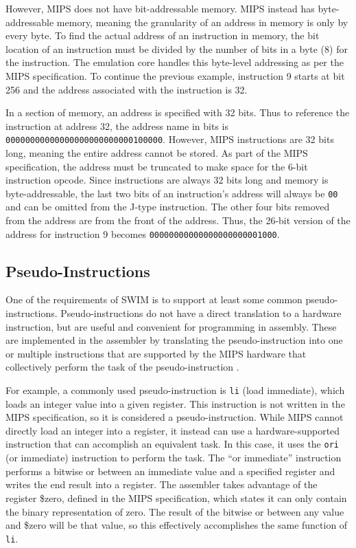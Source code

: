 \documentclass[
    paper=letter,
    parskip=half,
    fontsize=12pt,
    titlepage=firstiscover,
    toc=bibliography,
    numbers=endperiod
]{scrartcl}
\begin{document}
However, MIPS does not have bit-addressable
\cite{sciencedirect-addressable-memory} memory. MIPS instead has
byte-addressable memory, meaning the granularity of an address in memory
is only by every byte. To find the actual address of an instruction in
memory, the bit location of an instruction must be divided by the number
of bits in a byte (8) for the instruction. The emulation core handles
this byte-level addressing as per the MIPS specification. To continue
the previous example, instruction 9 starts at bit 256 and the address
associated with the instruction is 32.

In a section of memory, an address is specified with 32 bits. Thus to
reference the instruction at address 32, the address name in bits is
\texttt{00000000000000000000000000100000}. However, MIPS instructions
are 32 bits long, meaning the entire address cannot be stored. As part
of the MIPS specification, the address must be truncated to make space
for the 6-bit instruction opcode. Since instructions are always 32 bits
long and memory is byte-addressable, the last two bits of an
instruction's address will always be \texttt{00} and can be omitted from
the J-type instruction. The other four bits removed from the address are
from the front of the address. Thus, the 26-bit version of the address
for instruction 9 becomes \texttt{00000000000000000000001000}.

\subsection{Pseudo-Instructions}

One of the requirements of SWIM is to support at least some common
pseudo-instructions. Pseudo-instructions do not have a direct
translation to a hardware instruction, but are useful and convenient for
programming in assembly. These are implemented in the assembler by
translating the pseudo-instruction into one or multiple instructions
that are supported by the MIPS hardware that collectively perform the
task of the pseudo-instruction \cite{koehn-pseudoinstructions}.

For example, a commonly used pseudo-instruction is \texttt{li} (load
immediate), which loads an integer value into a given register. This
instruction is not written in the MIPS specification, so it is
considered a pseudo-instruction. While MIPS cannot directly load an
integer into a register, it instead can use a hardware-supported
instruction that can accomplish an equivalent task. In this case, it
uses the \texttt{ori} (or immediate) instruction to perform the task.
The ``or immediate'' instruction performs a bitwise or between an
immediate value and a specified register and writes the end result into
a register. The assembler takes advantage of the register \$zero,
defined in the MIPS specification, which states it can only contain the
binary representation of zero. The result of the bitwise or between any
value and \$zero will be that value, so this effectively accomplishes
the same function of \texttt{li}.
\end{document}
